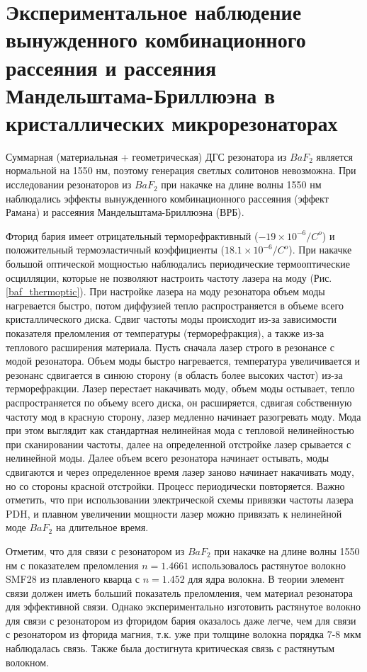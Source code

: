 \section{Экспериментальное наблюдение вынужденного комбинационного рассеяния и рассеяния Мандельштама-Бриллюэна в кристаллических микрорезонаторах}

Суммарная (материальная + геометрическая) ДГС резонатора из $BaF_2$ является нормальной на 1550 нм, поэтому генерация светлых солитонов невозможна. При исследовании резонаторов из $BaF_2$ при накачке на длине волны 1550 нм наблюдались эффекты вынужденного комбинационного рассеяния (эффект Рамана) и рассеяния Мандельштама-Бриллюэна (ВРБ).

Фторид бария имеет отрицательный терморефрактивный ($-19\times10^{-6}/C^{o}$) и положительный термоэластичный коэффициенты ($18.1\times10^{-6}/C^{o}$). При накачке большой оптической мощностью наблюдались периодические термооптические осцилляции, которые не позволяют настроить частоту лазера на моду (Рис. \ref{baf_thermoptic}). При настройке лазера на моду резонатора объем моды нагревается быстро, потом диффузией тепло распространяется в объеме всего кристаллического диска. Сдвиг частоты моды происходит из-за зависимости показателя преломления от температуры (терморефракция), а также из-за теплового расширения материала. Пусть сначала лазер строго в резонансе с модой резонатора. Объем моды быстро нагревается, температура увеличивается и резонанс сдвигается в синюю сторону (в область более высоких частот) из-за терморефракции. Лазер перестает накачивать моду, объем моды остывает, тепло распространяется по объему всего диска, он расширяется, сдвигая собственную частоту мод в красную сторону, лазер медленно начинает разогревать моду. Мода при этом выглядит как стандартная нелинейная мода с тепловой нелинейностью при сканировании частоты, далее на определенной отстройке лазер срывается с нелинейной моды. Далее объем всего резонатора начинает остывать, моды сдвигаются и через определенное время лазер заново начинает накачивать моду, но со стороны красной отстройки. Процесс периодически повторяется. Важно отметить, что при использовании электрической схемы привязки частоты лазера PDH, и плавном увеличении мощности лазер можно привязать к нелинейной моде $BaF_2$ на длительное время.

Отметим, что для связи с резонатором из $BaF_2$ при накачке на длине волны 1550 нм с показателем преломления $n=1.4661$ использовалось растянутое волокно SMF28 из плавленого кварца с $n=1.452$ для ядра волокна. В теории элемент связи должен иметь больший показатель преломления, чем материал резонатора для эффективной связи. Однако экспериментально изготовить растянутое волокно для связи с резонатором из фторидом бария оказалось даже легче, чем для связи с резонатором из фторида магния, т.к. уже при толщине волокна порядка 7-8 мкм наблюдалась связь. Также была достигнута критическая связь с растянутым волокном.

